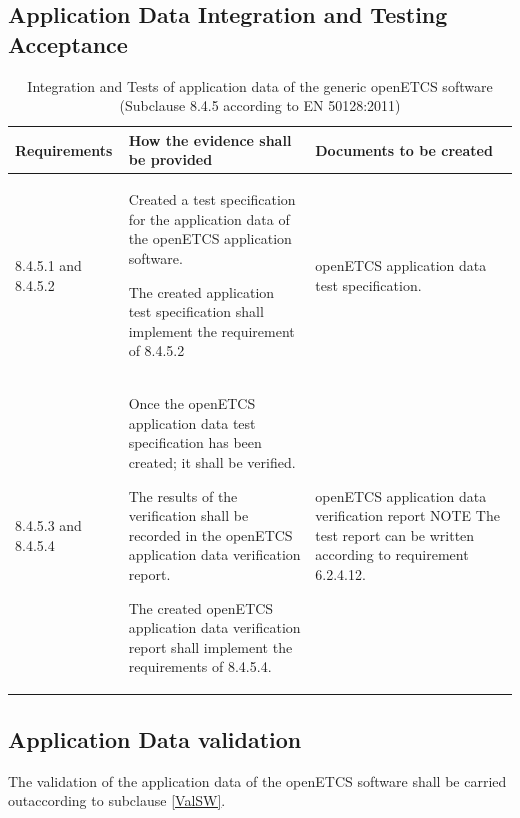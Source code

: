 \documentclass{template/openetcs_report}
\begin{document}
\subsection{Application Data Integration and Testing Acceptance}
{\footnotesize\sffamily\centering
\begin{longtable}{|p{2cm}|p{9cm}|p{3cm}|}
\caption{Integration and Tests of application data of the generic openETCS software (Subclause 8.4.5 according to EN 50128:2011)}\\
\hline
\bfseries Requirements & \bfseries How the evidence shall be provided & \bfseries Documents to be created\\
\hline
\hline
\endhead
\hline
\endfoot

8.4.5.1 and 8.4.5.2 & Created a test specification for the application data of the openETCS application software.

The created application test specification shall implement the requirement of 8.4.5.2
& openETCS application data test specification.\\ 
\hline
8.4.5.3 and 8.4.5.4 & Once the openETCS application data test specification has been created; it shall be verified.

The results of the verification shall be recorded in the openETCS application data verification report.

The created openETCS application data verification report shall implement the requirements of 8.4.5.4.
& openETCS application data verification report
\linebreak
\linebreak
NOTE\linebreak
The test report can be written according to requirement 6.2.4.12.\\ 
\hline
\end{longtable}}


\subsection{Application Data validation}
The validation of the application data of the openETCS software shall be carried outaccording to subclause \ref{ValSW}.
\end{document}
